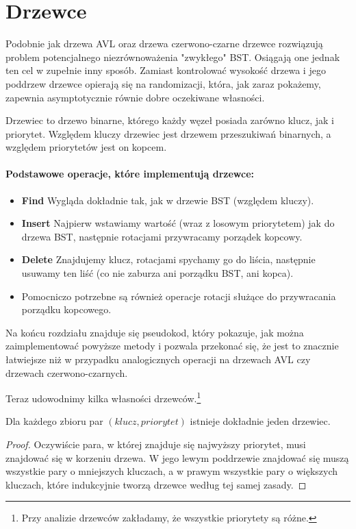 \section{Drzewce}

\label{sec:drzewce}

Podobnie jak drzewa AVL oraz drzewa czerwono-czarne drzewce rozwiązują problem potencjalnego niezrównoważenia "zwykłego" BST.
Osiągają one jednak ten cel w zupełnie inny sposób.
Zamiast kontrolować wysokość drzewa i jego poddrzew drzewce opierają się na randomizacji, która, jak zaraz pokażemy, zapewnia asymptotycznie równie dobre oczekiwane własności. 

\begin{definition} 
Drzewiec to drzewo binarne, którego każdy węzeł posiada zarówno klucz, jak i priorytet.
Względem kluczy drzewiec jest drzewem przeszukiwań binarnych, a względem priorytetów jest on kopcem.
\end{definition}

\paragraph{Podstawowe operacje, które implementują drzewce:}
\begin{itemize}
    \item \textbf{Find} Wygląda dokładnie tak, jak w drzewie BST (względem kluczy).
    \item \textbf{Insert} Najpierw wstawiamy wartość (wraz z losowym priorytetem) jak do drzewa BST, następnie rotacjami przywracamy porządek kopcowy.
    \item \textbf{Delete} Znajdujemy klucz, rotacjami spychamy go do liścia, następnie usuwamy ten liść (co nie zaburza ani porządku BST, ani kopca).
    \item Pomocniczo potrzebne są również operacje rotacji służące do przywracania porządku kopcowego.
\end{itemize}

Na końcu rozdziału znajduje się pseudokod, który pokazuje, jak można zaimplementować powyższe metody i pozwala przekonać się, że jest to znacznie łatwiejsze niż w przypadku analogicznych operacji na drzewach AVL czy drzewach czerwono-czarnych.

Teraz udowodnimy kilka własności drzewców.\footnote{Przy analizie drzewców zakładamy, że wszystkie priorytety są różne.}

\begin{theorem}
\label{unique treap}
 Dla każdego zbioru par $(klucz, priorytet)$ istnieje dokładnie jeden drzewiec.
\end{theorem}
\begin{proof}
Oczywiście para, w której znajduje się najwyższy priorytet, musi znajdować się w korzeniu drzewa.
W jego lewym poddrzewie znajdować się muszą wszystkie pary o mniejszych kluczach, a w prawym wszystkie pary o większych kluczach, które indukcyjnie tworzą drzewce według tej samej zasady.
\end{proof}

